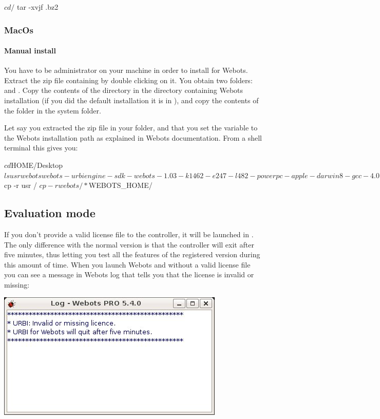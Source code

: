 \begin{shell}
$ cd /
$ tar -xvjf  .bz2
\end{shell}

\subsubsection{MacOs}

\paragraph{Manual install}

You have to be administrator on your machine in order to install \urbi
for Webots.  Extract the zip file containing \urbi by double clicking
on it.  You obtain two folders:  and .  Copy
the contents of the  directory in the directory
containing Webots installation (if you did the default installation it
is in ), and copy the contents of the
 folder in the  system folder.

Let say you extracted the zip file in your  folder, and
that you set the variable  to the Webots
installation path as explained in Webots documentation.  From a shell
terminal this gives you:

\begin{shell}
$ cd $HOME/Desktop
$ ls
usr webots
webots-urbiengine-sdk-webots-1.03-k1462-e247-l482-powerpc-apple-darwin8-gcc-4.0.1.zip
$ cp -r usr /
$ cp -r webots/* $WEBOTS_HOME/
\end{shell}

\subsection{Evaluation mode}

If you don't provide a valid license file to the \urbi controller, it
will be launched in . The only difference with
the normal version is that the controller will exit after five
minutes, thus letting you test all the features of the registered
version during this amount of time. When you launch Webots and \urbi
without a valid license file you can see a message in Webots log that
tells you that the license is invalid or missing:

\begin{center}
  \includegraphics{img/webots/no-license-webots-log-msg}
\end{center}


